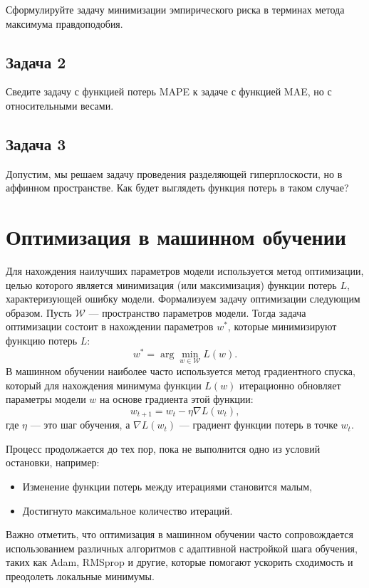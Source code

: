 Сформулируйте задачу минимизации эмпирического риска в терминах метода максимума правдоподобия.

\subsection*{Задача 2}

Сведите задачу с функцией потерь MAPE к задаче с функцией MAE, но с относительными весами.

\subsection*{Задача 3}
Допустим, мы решаем задачу проведения разделяющей гиперплоскости, но в аффинном пространстве. Как будет выглядеть функция потерь в таком случае?

\section{Оптимизация в машинном обучении}

Для нахождения наилучших параметров модели используется метод оптимизации, целью которого является минимизация (или максимизация) функции потерь \( L \), характеризующей ошибку модели. Формализуем задачу оптимизации следующим образом. Пусть \( \mathcal{W} \) — пространство параметров модели. Тогда задача оптимизации состоит в нахождении параметров \( w^* \), которые минимизируют функцию потерь \( L \):
\[
    w^* = \arg\min_{w \in \mathcal{W}} L(w).
\]
В машинном обучении наиболее часто используется метод градиентного спуска, который для нахождения минимума функции \( L(w) \) итерационно обновляет параметры модели \( w \) на основе градиента этой функции:
\[
    w_{t+1} = w_t - \eta \nabla L(w_t),
\]
где \( \eta \) — это шаг обучения, а \( \nabla L(w_t) \) — градиент функции потерь в точке \( w_t \).

Процесс продолжается до тех пор, пока не выполнится одно из условий остановки, например:
\begin{itemize}
    \item Изменение функции потерь между итерациями становится малым,
    \item Достигнуто максимальное количество итераций.
\end{itemize}

Важно отметить, что оптимизация в машинном обучении часто сопровождается использованием различных алгоритмов с адаптивной настройкой шага обучения, таких как Adam, RMSprop и другие, которые помогают ускорить сходимость и преодолеть локальные минимумы.

